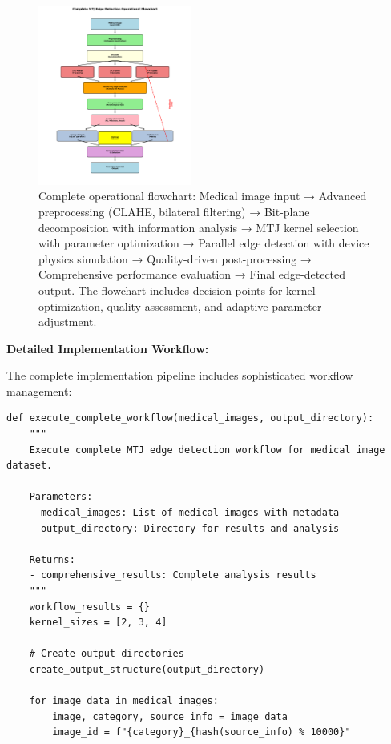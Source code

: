 \documentclass[conference]{IEEEtran}
\begin{document}
{{\begin{figure}[htbp]
\centerline{\includegraphics[width=0.45\textwidth]{operation_flowchart.png}}
\caption{Complete operational flowchart: Medical image input → Advanced preprocessing (CLAHE, bilateral filtering) → Bit-plane decomposition with information analysis → MTJ kernel selection with parameter optimization → Parallel edge detection with device physics simulation → Quality-driven post-processing → Comprehensive performance evaluation → Final edge-detected output. The flowchart includes decision points for kernel optimization, quality assessment, and adaptive parameter adjustment.}
\label{fig:flowchart}
\end{figure}

\textbf{Detailed Implementation Workflow:}

The complete implementation pipeline includes sophisticated workflow management:

\begin{lstlisting}[caption={Complete workflow management system}]
def execute_complete_workflow(medical_images, output_directory):
    """
    Execute complete MTJ edge detection workflow for medical image dataset.
    
    Parameters:
    - medical_images: List of medical images with metadata
    - output_directory: Directory for results and analysis
    
    Returns:
    - comprehensive_results: Complete analysis results
    """
    workflow_results = {}
    kernel_sizes = [2, 3, 4]
    
    # Create output directories
    create_output_structure(output_directory)
    
    for image_data in medical_images:
        image, category, source_info = image_data
        image_id = f"{category}_{hash(source_info) % 10000}"
        

\end{lstlisting}}}
\end{document}
